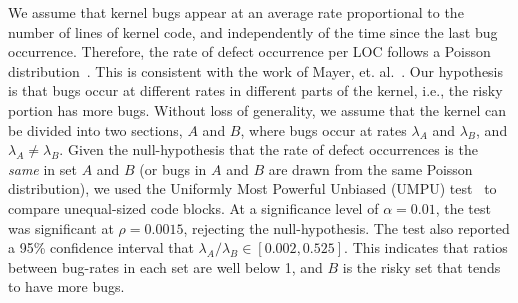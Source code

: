 We assume that kernel bugs appear at an average rate proportional to the
number of lines of kernel code, and independently of the time since the last
bug occurrence. Therefore, the rate of defect occurrence per LOC
follows a Poisson distribution~\cite{Poisson-distribution}.
This is consistent with the work of Mayer, et. al.~\cite{mayer1989probability}.
Our hypothesis is that bugs occur at different rates in different parts of the kernel, 
i.e., the risky portion has more bugs. Without
loss of generality, we assume that the kernel can be divided into two sections,
$A$ and $B$, where bugs occur at rates $\lambda_A$ and
$\lambda_B$, and $\lambda_A \neq \lambda_B$. Given the null-hypothesis
that the rate of defect occurrences is the \textit{same} in set $A$ and $B$
(or bugs in $A$ and $B$ are drawn from the same Poisson distribution),
we used the Uniformly Most Powerful Unbiased (UMPU) test~\cite{shiue1982experiment}
to compare unequal-sized code blocks.
At a significance level of $\alpha=0.01$, the test was significant at
$\rho=0.0015$, rejecting the null-hypothesis.
The test also reported a 95\% confidence interval that $\lambda_A / \lambda_B 
\in [0.002, 0.525]$. This indicates that ratios between bug-rates in each set are well
below 1, and $B$ is the risky set that tends to have more bugs. 

